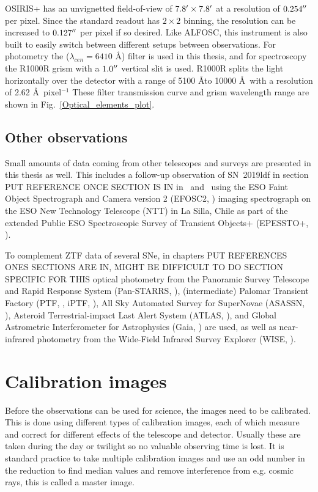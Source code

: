 \documentclass[a4paper,oneside,12pt, class=Latex/Classes/PhDthesisPSnPDF, crop=false]{standalone}
\begin{document}
OSIRIS+ has an unvignetted field-of-view of $7.8^{\prime}\times7.8^{\prime}$ at a resolution of $0.254^{\prime\prime}$ per pixel. Since the standard readout has $2\times2$ binning, the resolution can be increased to $0.127^{\prime\prime}$ per pixel if so desired. Like ALFOSC, this instrument is also built to easily switch between different setups between observations. For photometry the \ztfr ($\lambda_{cen} =6410$ \AA) filter is used in this thesis, and for spectroscopy the R1000R grism with a $1.0^{\prime\prime}$ vertical slit is used. R1000R splits the light horizontally over the detector with a range of 5100 \AA to 10000 \AA\ with a resolution of 2.62 \AA\ pixel$^{-1}$ These filter transmission curve and grism wavelength range are shown in Fig.~\ref{Optical_elements_plot}.


\subsection{Other observations}
Small amounts of data coming from other telescopes and surveys are presented in this thesis as well. This includes a follow-up observation of SN~2019ldf in section \color{red} PUT REFERENCE ONCE SECTION IS IN \color{black} in \ztfg\ and \ztfr\ using the ESO Faint Object Spectrograph and Camera version 2 (EFOSC2, \citealt{EFOSC2}) imaging spectrograph on the ESO New Technology Telescope (NTT) in La Silla, Chile as part of the extended Public ESO Spectroscopic Survey of Transient Objects+ (EPESSTO+, \citealt{PESSTO}).

To complement ZTF data of several SNe, in chapters \color{red} PUT REFERENCES ONES SECTIONS ARE IN, MIGHT BE DIFFICULT TO DO SECTION SPECIFIC FOR THIS \color{black} optical photometry from the Panoramic Survey Telescope and Rapid Response System (Pan-STARRS, \citealt{Pan-STARRS1}), (intermediate) Palomar Transient Factory (PTF, \citealt{PTF_1, PTF_2}, iPTF, \citealt{iPTF}), All Sky Automated Survey for SuperNovae (ASASSN, \citealt{ASASSN_paper1, ASASSN_catalog}), Asteroid Terrestrial-impact Last Alert System (ATLAS, \citealt{ATLAS}),  and Global Astrometric Interferometer for Astrophysics (Gaia, \citealt{Gaia}) are used, as well as near-infrared photometry from the Wide-Field Infrared Survey Explorer (WISE, \citealt{WISE}).


\section{Calibration images}
\label{calibration}
Before the observations can be used for science, the images need to be calibrated. This is done using different types of calibration images, each of which measure and correct for different effects of the telescope and detector. Usually these are taken during the day or twilight so no valuable observing time is lost. It is standard practice to take multiple calibration images and use an odd number in the reduction to find median values and remove interference from e.g. cosmic rays, this is called a master image.
\end{document}
